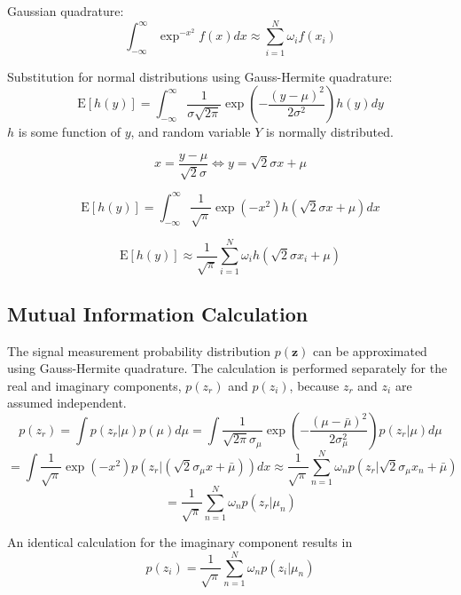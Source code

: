 \documentclass{article}         %
\theoremstyle{definition}
\theoremstyle{remark}
\newcommand{\eq}[1]{\begin{equation} #1 \end{equation}}
\newcommand{\zbf}{\mathbf{z}}
\newcommand{\zcond}{\mathbf{z}|\mu}
\newcommand{\Gscript}{\mathcal{G}}
\newcommand{\paren}[1]{\left(#1\right)}
\newcommand{\expect}[1]{\mathrm{E}\left[#1\right]}
\newcommand{\intinfty}{\int_{-\infty}^\infty}
\newcommand{\sumin}{\sum_{i=1}^N}
\newcommand{\normpdf}[3]{\frac{1}{\sqrt{2\pi}#3}\exp\paren{-\frac{\paren{#1-#2}^2}{2#3^2}}}
\begin{document}
Gaussian quadrature:
\eq{\intinfty\exp^{-x^2}f\paren{x}dx \approx \sumin\omega_if\paren{x_i}}

Substitution for normal distributions using Gauss-Hermite quadrature:
\eq{\expect{h\paren{y}} = \intinfty\frac{1}{\sigma\sqrt{2\pi}}\exp\paren{-\frac{\paren{y-\mu}^2}{2\sigma^2}}h\paren{y}dy}
$h$ is some function of $y$, and random variable $Y$ is normally distributed.

\eq{x = \frac{y-\mu}{\sqrt{2}\sigma} \Leftrightarrow y = \sqrt{2}\sigma x+\mu}

\eq{\expect{h\paren{y}} = \intinfty\frac{1}{\sqrt{\pi}}\exp\paren{-x^2}h\paren{\sqrt{2}\sigma x+\mu}dx}

\eq{\expect{h\paren{y}} \approx \frac{1}{\sqrt{\pi}}\sumin\omega_i h\paren{\sqrt{2}\sigma x_i+\mu}}

\subsection{Mutual Information Calculation}

%

The signal measurement probability distribution $p\paren{\zbf}$ can be approximated using Gauss-Hermite quadrature. The calculation is performed separately for the real and imaginary components, $p\paren{z_r}$ and $p\paren{z_i}$, because $z_r$ and $z_i$ are assumed independent.
\eq{p\paren{z_r} = \int p\paren{z_r|\mu}p\paren{\mu}d\mu = \int\normpdf{\mu}{\bar{\mu}}{\sigma_\mu}p\paren{z_r|\mu}d\mu}
\eq{= \int\frac{1}{\sqrt{\pi}}\exp\paren{-x^2}p\paren{z_r|\paren{\sqrt{2}\sigma_\mu x+\bar{\mu}}}dx
\approx \frac{1}{\sqrt{\pi}}\sum_{n=1}^N\omega_np\paren{z_r|\sqrt{2}\sigma_\mu x_n+\bar{\mu}}}
\eq{= \frac{1}{\sqrt{\pi}}\sum_{n=1}^N\omega_np\paren{z_r|\mu_n}}

An identical calculation for the imaginary component results in
\eq{p\paren{z_i} = \frac{1}{\sqrt{\pi}}\sum_{n=1}^N\omega_np\paren{z_i|\mu_n}}
\end{document}
